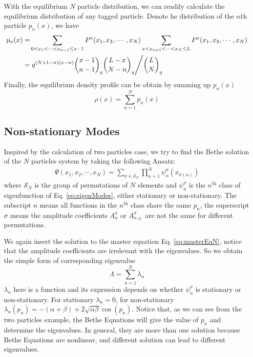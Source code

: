 With the equilibrium $N$ particle distribution, we can readily calculate the
equilibrium distribution of any tagged particle. Denote he distribution of the
$n$th particle $p_n(x)$, we have
\begin{equation}
    \begin{aligned}
        \label{eq:pdfTaggedParticle}
        p_n(x) = & \sum_{0<x_1<\cdots<x_{n-1}\le x-1}P^e(x_1, x_2, \cdots, x_N)
        \sum_{x<x_{n+1}<\cdots<x_{N}\le L}P^e(x_1, x_2, \cdots, x_N) \\
        = & \left. q^{(N+1-n)(x-n)} \binom{x-1}{n-1}_q\binom{L-x}{N-n}_q 
            \middle/  \binom{L}{N}_q \right.
    \end{aligned}
\end{equation}
Finally, the equilibrium density profile can be obtain by summing up $p_n(x)$
\begin{equation}
    \label{eq:densityProfile}
    \rho(x) = \sum_{n=1}^N p_n(x) 
\end{equation}


\subsection{Non-stationary Modes}
\label{sub:non_stationary_modes}

Inspired by the calculation of two particles case, we try to find the Bethe
solution of the $N$ particles system by taking the following Ansatz: 
\begin{equation}
    \label{eq:nonstationaryModesN}
    \begin{aligned}
        \Psi(x_1, x_2, \cdots, x_N) = \sum_{\sigma\in \mathcal{S}_N}
        \prod_{n=1}^N \psi_n^{\sigma}(x_{\sigma(n)})
    \end{aligned}
\end{equation}
where $\mathcal{S}_N$ is the group of permutations of $N$ elements and
$\psi_n^{\sigma}$ is the $n^{\text{th}}$ class of eigenfunction of Eq.
\eqref{eq:eigenModes}, either stationary or non-stationary. The subscript $n$
means all functions in the $n^{\text{th}}$ class share the same $p_n$, the
superscript $\sigma$ means the amplitude coefficients $A_n^{\sigma}$ or
$A_{n\pm}^{\sigma}$ are not the same for different permutations.

We again insert the solution to the master equation Eq. \eqref{eq:masterEqN},
notice that the amplitude coefficients are irrelevant with the eigenvalues. So
we obtain the simple form of corresponding eigenvalue 
\begin{equation}
    \label{eq:eigenvaluesN}
    \Lambda = \sum_{n=1}^N \lambda_n
\end{equation}
$\lambda_n$ here is a function and its expression depends on whether
$\psi_n^{\sigma}$ is stationary or non-stationary. For stationary $\lambda_n=0$,
for non-stationary $\lambda_n(p_n)=
-(\alpha+\beta)+2\sqrt{\alpha\beta}\cos(p_n)$.  Notice that, as we can see from
the two particles example, the Bethe Equations will give the value of $p_n$ and
determine the eigenvalues. In general, they are more than one solution because
Bethe Equations are nonlinear, and different solution can lead to different
eigenvalues.

